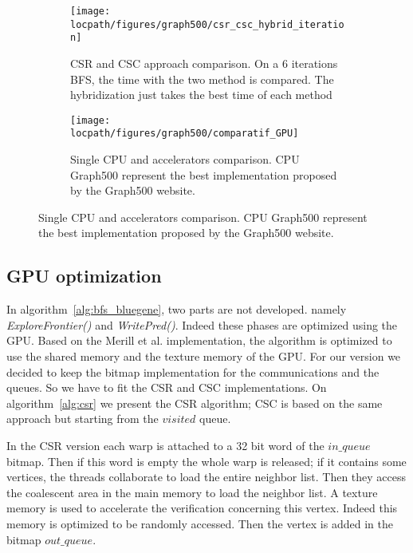 \begin{figure}[!t]
\begin{subfigure}[t]{.48\textwidth}
	\centering
	\texttt{[image: \\locpath/figures/graph500/csr\_csc\_hybrid\_iteration]}
	\caption{CSR and CSC approach comparison. On a 6 iterations BFS, the time with the two method is compared. The hybridization just takes the best time of each method}
	\label{fig:csr_csc}
\end{subfigure}
\hfill
\begin{subfigure}[t]{.48\textwidth}
	\centering
	\texttt{[image: \\locpath/figures/graph500/comparatif\_GPU]}
	\caption[]{Single CPU and accelerators comparison. CPU Graph500 represent the best implementation proposed by the Graph500 website. }
	\label{fig:single_cpu_accelerators}
\end{subfigure}
\end{figure}

\subsection{GPU optimization}

In algorithm~\ref{alg:bfs_bluegene}, two parts are not developed. namely \textit{ExploreFrontier()} and \textit{WritePred()}. Indeed these phases are optimized using the GPU. 
Based on the Merill et al. implementation, the algorithm is optimized to use the shared memory and the texture memory of the GPU. 
For our version we decided to keep the bitmap implementation for the communications and the queues. So we have to fit the CSR and CSC implementations. 
On algorithm~\ref{alg:csr} we present the CSR algorithm;
CSC is based on the same approach but starting from the $visited$ queue. 

In the CSR version each warp is attached to a 32 bit word of the $in\_queue$ bitmap. 
Then if this word is empty the whole warp is released; 
if it contains some vertices, the threads collaborate to load the entire neighbor list. 
Then they access the coalescent area in the main memory to load the neighbor list. 
A texture memory is used to accelerate the verification concerning this vertex. Indeed this memory is optimized to be randomly accessed. 
Then the vertex is added in the bitmap $out\_queue$.

